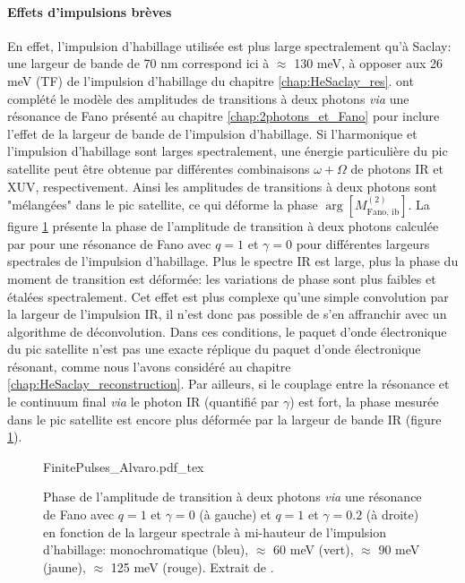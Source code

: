 \paragraph*{Effets d'impulsions brèves} En effet, l'impulsion d'habillage utilisée est plus large spectralement qu'à Saclay: une largeur de bande de 70 nm correspond ici à $\approx$ 130 meV, à opposer aux 26 meV (TF) de l'impulsion d'habillage du chapitre \ref{chap:HeSaclay_res}.   ont complété le modèle des amplitudes de transitions à deux photons \textit{via} une résonance de Fano présenté au chapitre \ref{chap:2photons_et_Fano} pour inclure l'effet de la largeur de bande de l'impulsion d'habillage. Si l'harmonique et l'impulsion d'habillage sont larges spectralement, une énergie particulière du pic satellite peut être obtenue par différentes combinaisons $\omega + \Omega$ de photons IR et XUV, respectivement. Ainsi les amplitudes de transitions à deux photons sont "mélangées" dans le pic satellite, ce qui déforme la phase $\arg[M^{(2)}_{\text{Fano, ib}}]$. La figure \ref{fig:FinitePulses_Alvaro} présente la phase de l'amplitude de transition à deux photons calculée par  pour une résonance de Fano avec $q = 1$ et $\gamma = 0$ pour différentes largeurs spectrales de l'impulsion d'habillage. Plus le spectre IR est large, plus la phase du moment de transition est déformée: les variations de phase sont plus faibles et étalées spectralement. Cet effet est plus complexe qu'une simple convolution par la largeur de l'impulsion IR, il n'est donc pas possible de s'en affranchir avec un algorithme de déconvolution. Dans ces conditions, le paquet d'onde électronique du pic satellite n'est pas une exacte réplique du paquet d'onde électronique résonant, comme nous l'avons considéré au chapitre \ref{chap:HeSaclay_reconstruction}. Par ailleurs, si le couplage entre la résonance et le continuum final \textit{via} le photon IR (quantifié par $\gamma$) est fort, la phase mesurée dans le pic satellite est encore plus déformée par la largeur de bande IR (figure \ref{fig:FinitePulses_Alvaro}). %

\begin{figure}
\centering
\def\svgwidth{0.6\textwidth}
{FinitePulses_Alvaro.pdf_tex}
\caption{Phase de l'amplitude de transition à deux photons \textit{via} une résonance de Fano avec $q = 1$ et $\gamma = 0$ (à gauche) et $q = 1$ et $\gamma = 0.2$ (à droite) en fonction de la largeur spectrale à mi-hauteur de l'impulsion d'habillage: monochromatique (bleu), $\approx$ 60 meV (vert), $\approx$ 90 meV (jaune), $\approx$ 125 meV (rouge). Extrait de .}
\label{fig:FinitePulses_Alvaro}
\end{figure}

